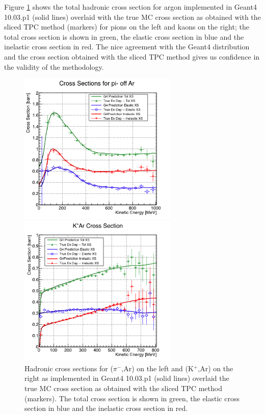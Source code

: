 Figure \ref{fig:TrueMCXS2} shows the total hadronic cross section for argon implemented in Geant4 10.03.p1 (solid lines) overlaid with the true MC cross section as obtained with the sliced TPC method (markers) for pions on the left and kaons on the right; the total cross section is shown in green,  the elastic cross section in blue and the inelastic cross section in red.  The nice agreement with the Geant4 distribution and the cross section  obtained with the sliced TPC method gives us confidence in the  validity of the methodology. 
        
\begin{figure}
\begin{minipage}[b]{.53\textwidth}  
  \centering  
\includegraphics[width=3in]{Chapter-4/Images/PionTrueXS.png}
\end{minipage}%
\begin{minipage}[b]{0.53\textwidth}  
  \centering  
\includegraphics[width=3in]{Chapter-4/Images/KaonTrueXS.png}
\end{minipage}
\caption{Hadronic cross sections for ($\pi^-$,Ar) on the left and (K$^+$,Ar) on the right as implemented in Geant4 10.03.p1 (solid lines) overlaid the true MC cross section as obtained with the sliced TPC method (markers). The total cross section is shown in green,  the elastic cross section in blue and the inelastic cross section in red.}
\label{fig:TrueMCXS2}
\end{figure}






